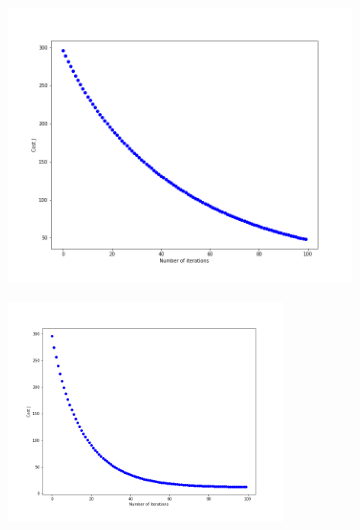 \documentclass[english,11pt]{article}
\begin{document}
\begin{figure}[H]
\centering
\begin{subfigure}{.5\textwidth}
\centering
\includegraphics[width=.8\linewidth]{../hw1/part1/3_1_B5_lr0_01.png}
\end{subfigure}%
\begin{subfigure}{.5\textwidth}
\centering
\includegraphics[width=0.8\textwidth]{../hw1/part1/3_1_B5_lr0_03}
\end{subfigure}


\end{figure}
\end{document}
